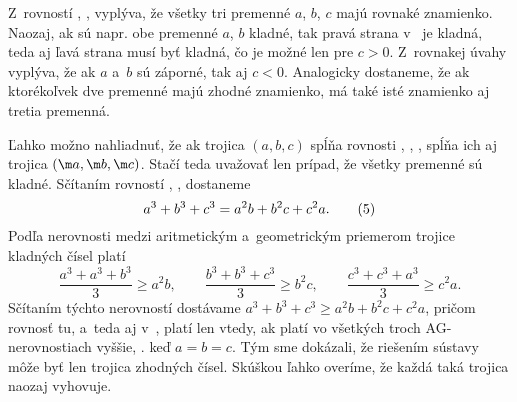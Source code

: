 {Z~rovností , ,  vyplýva, že všetky tri premenné $a$, $b$, $c$ majú rovnaké znamienko. Naozaj, ak sú napr. obe premenné $a$, $b$ kladné, tak pravá strana v~ je kladná, teda aj ľavá strana musí byť kladná, čo je možné len pre $c>0$. Z~rovnakej úvahy vyplýva, že ak $a$ a~$b$ sú záporné, tak aj $c<0$. Analogicky dostaneme, že ak ktorékoľvek dve premenné majú zhodné znamienko, má také isté znamienko aj tretia premenná.

Ľahko možno nahliadnuť, že ak trojica $(a,b,c)$ spĺňa rovnosti , , , spĺňa ich aj trojica $(\m a,\m b,\m c)$. Stačí teda uvažovať len prípad, že všetky premenné sú kladné. Sčítaním rovností , ,  dostaneme
$$
a^3+b^3+c^3=a^2b+b^2c+c^2a.\tag5
$$
Podľa nerovnosti medzi aritmetickým a~geometrickým priemerom trojice kladných čísel platí
$$
\frac{a^3+a^3+b^3}3\ge a^2b,\qquad
\frac{b^3+b^3+c^3}3\ge b^2c,\qquad
\frac{c^3+c^3+a^3}3\ge c^2a.
$$
Sčítaním týchto nerovností dostávame $a^3+b^3+c^3\ge a^2b+b^2c+c^2a$, pričom rovnosť tu, a~teda aj v~, platí len vtedy, ak platí vo všetkých troch AG-nerovnostiach vyššie, \tj. keď $a=b=c$. Tým sme dokázali, že riešením sústavy môže byť len trojica zhodných čísel. Skúškou ľahko overíme, že každá taká trojica naozaj vyhovuje.
}

